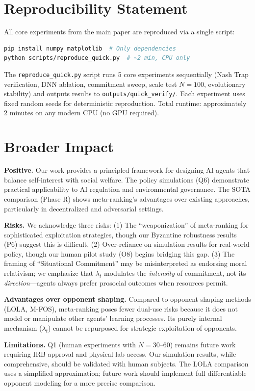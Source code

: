 \documentclass{article}
\begin{document}
\section{Reproducibility Statement}
\label{app:repro}

All core experiments from the main paper are reproduced via a single script:

\begin{lstlisting}[language=bash]
pip install numpy matplotlib  # Only dependencies
python scripts/reproduce_quick.py  # ~2 min, CPU only
\end{lstlisting}

The \texttt{reproduce\_quick.py} script runs 5 core experiments sequentially (Nash Trap verification, DNN ablation, commitment sweep, scale test $N{=}100$, evolutionary stability) and outputs results to \texttt{outputs/quick\_verify/}. Each experiment uses fixed random seeds for deterministic reproduction. Total runtime: approximately 2 minutes on any modern CPU (no GPU required).


\section{Broader Impact}
\label{app:impact}

\textbf{Positive.}
Our work provides a principled framework for designing AI agents that balance self-interest with social welfare. The policy simulations (Q6) demonstrate practical applicability to AI regulation and environmental governance. The SOTA comparison (Phase R) shows meta-ranking's advantages over existing approaches, particularly in decentralized and adversarial settings.

\textbf{Risks.}
We acknowledge three risks:
(1) The ``weaponization'' of meta-ranking for sophisticated exploitation strategies, though our Byzantine robustness results (P6) suggest this is difficult.
(2) Over-reliance on simulation results for real-world policy, though our human pilot study (O8) begins bridging this gap.
(3) The framing of ``Situational Commitment'' may be misinterpreted as endorsing moral relativism; we emphasize that $\lambda_t$ modulates the \textit{intensity} of commitment, not its \textit{direction}---agents always prefer prosocial outcomes when resources permit.

\textbf{Advantages over opponent shaping.}
Compared to opponent-shaping methods (LOLA, M-FOS), meta-ranking poses fewer dual-use risks because it does not model or manipulate other agents' learning processes. Its purely internal mechanism ($\lambda_t$) cannot be repurposed for strategic exploitation of opponents.

\textbf{Limitations.}
Q1 (human experiments with $N{=}30$--60) remains future work requiring IRB approval and physical lab access. Our simulation results, while comprehensive, should be validated with human subjects. The LOLA comparison uses a simplified approximation; future work should implement full differentiable opponent modeling for a more precise comparison.



\end{document}
